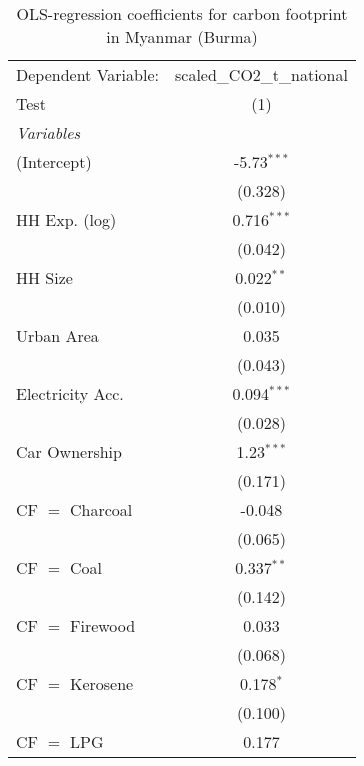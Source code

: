 
\begin{table}[htbp!]
   \centering
   \small
   \begin{adjustbox}{width = 1\textwidth, max height = 0.95\textheight, center}
      \begin{threeparttable}[b]
         \caption{\label{tab:OLS_2_MMR} OLS-regression coefficients for carbon footprint in Myanmar (Burma)}
         \begin{tabular}{lc}
            \tabularnewline \midrule \midrule
            Dependent Variable: & scaled\_CO2\_t\_national\\     
            Test                & (1)\\  
            \midrule
            \emph{Variables}\\
            (Intercept)         & -5.73$^{***}$\\   
                                & (0.328)\\   
            HH Exp. (log)       & 0.716$^{***}$\\   
                                & (0.042)\\   
            HH Size             & 0.022$^{**}$\\   
                                & (0.010)\\   
            Urban Area          & 0.035\\   
                                & (0.043)\\   
            Electricity Acc.    & 0.094$^{***}$\\   
                                & (0.028)\\   
            Car Ownership       & 1.23$^{***}$\\   
                                & (0.171)\\   
            CF $=$ Charcoal     & -0.048\\   
                                & (0.065)\\   
            CF $=$ Coal         & 0.337$^{**}$\\   
                                & (0.142)\\   
            CF $=$ Firewood     & 0.033\\   
                                & (0.068)\\   
            CF $=$ Kerosene     & 0.178$^{*}$\\   
                                & (0.100)\\   
            CF $=$ LPG          & 0.177\\   

\end{tabular}
\end{threeparttable}
\end{adjustbox}
\end{table}
